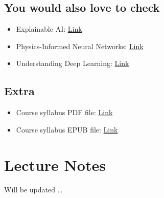 \documentclass[
]{book}
\begin{document}
\hypertarget{you-would-also-love-to-check}{%
\section*{You would also love to check}\label{you-would-also-love-to-check}}

\begin{itemize}
\item
  Explainable AI: \href{https://youtube.com/playlist?list=PLV8yxwGOxvvovp-j6ztxhF3QcKXT6vORU\&si=7N_VPAK0OkqRGiIz}{Link}
\item
  Physics-Informed Neural Networks: \href{https://youtube.com/playlist?list=PLXmYoJbJ848pkMm9NGZZKXUQJ8XWIXZX8\&si=_AOgnC__wzOGc9xC}{Link}
\item
  Understanding Deep Learning: \href{https://github.com/udlbook/udlbook/tree/main}{Link}
\end{itemize}

\hypertarget{extra}{%
\section{Extra}\label{extra}}

\begin{itemize}
\item
  Course syllabus PDF file: \href{https://neuralincendio.github.io/Intro2DeepLearning.pdf}{Link}
\item
  Course syllabus EPUB file: \href{https://neuralincendio.github.io/Intro2DeepLearning.epub}{Link}
\end{itemize}

\hypertarget{Lecture_Notes}{%
\chapter{Lecture Notes}\label{Lecture_Notes}}

Will be updated \ldots{}

  
\end{document}
